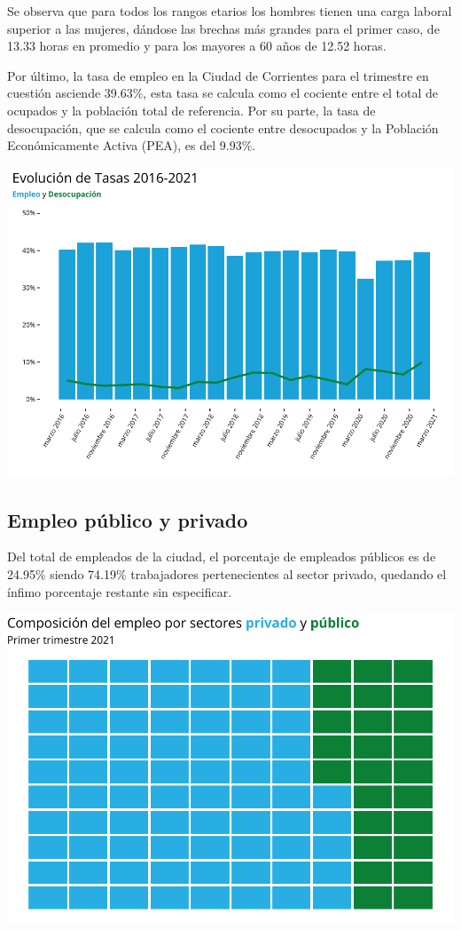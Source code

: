\documentclass[
]{article}
\begin{document}
Se observa que para todos los rangos etarios los hombres tienen una
carga laboral superior a las mujeres, dándose las brechas más grandes
para el primer caso, de 13.33 horas en promedio y para los mayores a 60
años de 12.52 horas.

Por último, la tasa de empleo en la Ciudad de Corrientes para el
trimestre en cuestión asciende 39.63\%, esta tasa se calcula como el
cociente entre el total de ocupados y la población total de referencia.
Por su parte, la tasa de desocupación, que se calcula como el cociente
entre desocupados y la Población Económicamente Activa (PEA), es del
9.93\%.

\includegraphics{Informe-Mercado-Laboral_files/figure-latex/unnamed-chunk-23-1.pdf}

\hypertarget{empleo-puxfablico-y-privado}{%
\subsection{Empleo público y
privado}\label{empleo-puxfablico-y-privado}}

Del total de empleados de la ciudad, el porcentaje de empleados públicos
es de 24.95\% siendo 74.19\% trabajadores pertenecientes al sector
privado, quedando el ínfimo porcentaje restante sin especificar.

\includegraphics{Informe-Mercado-Laboral_files/figure-latex/unnamed-chunk-25-1.pdf}
\end{document}
